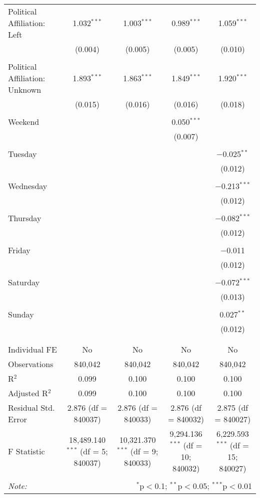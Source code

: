 \documentclass[
]{article}
\begin{document}
\begin{table}[!htbp]
{\begin{tabular}{@{\extracolsep{5pt}}lcccc}
 Political Affiliation: Left & 1.032$^{***}$ & 1.003$^{***}$ & 0.989$^{***}$ & 1.059$^{***}$ \\ 
  & (0.004) & (0.005) & (0.005) & (0.010) \\ 
  & & & & \\ 
 Political Affiliation: Unknown & 1.893$^{***}$ & 1.863$^{***}$ & 1.849$^{***}$ & 1.920$^{***}$ \\ 
  & (0.015) & (0.016) & (0.016) & (0.018) \\ 
  & & & & \\ 
 Weekend &  &  & 0.050$^{***}$ &  \\ 
  &  &  & (0.007) &  \\ 
  & & & & \\ 
 Tuesday &  &  &  & $-$0.025$^{**}$ \\ 
  &  &  &  & (0.012) \\ 
  & & & & \\ 
 Wednesday &  &  &  & $-$0.213$^{***}$ \\ 
  &  &  &  & (0.012) \\ 
  & & & & \\ 
 Thursday &  &  &  & $-$0.082$^{***}$ \\ 
  &  &  &  & (0.012) \\ 
  & & & & \\ 
 Friday &  &  &  & $-$0.011 \\ 
  &  &  &  & (0.012) \\ 
  & & & & \\ 
 Saturday &  &  &  & $-$0.072$^{***}$ \\ 
  &  &  &  & (0.013) \\ 
  & & & & \\ 
 Sunday &  &  &  & 0.027$^{**}$ \\ 
  &  &  &  & (0.012) \\ 
  & & & & \\ 
\hline \\[-1.8ex] 
Individual FE & No & No & No & No \\ 
Observations & 840,042 & 840,042 & 840,042 & 840,042 \\ 
R$^{2}$ & 0.099 & 0.100 & 0.100 & 0.100 \\ 
Adjusted R$^{2}$ & 0.099 & 0.100 & 0.100 & 0.100 \\ 
Residual Std. Error & 2.876 (df = 840037) & 2.876 (df = 840033) & 2.876 (df = 840032) & 2.875 (df = 840027) \\ 
F Statistic & 18,489.140$^{***}$ (df = 5; 840037) & 10,321.370$^{***}$ (df = 9; 840033) & 9,294.136$^{***}$ (df = 10; 840032) & 6,229.593$^{***}$ (df = 15; 840027) \\ 
\hline 
\hline \\[-1.8ex] 
\textit{Note:}  & \multicolumn{4}{r}{$^{*}$p$<$0.1; $^{**}$p$<$0.05; $^{***}$p$<$0.01} \\ 
\end{tabular}
} 
\end{table} 
\newpage
\end{document}
